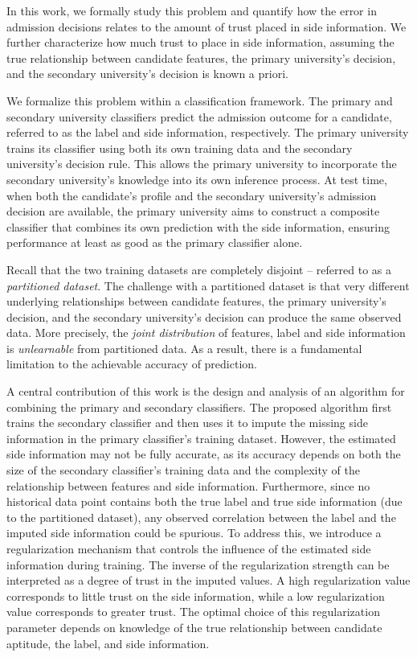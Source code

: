 In this work, we formally study this problem and quantify how the error in admission decisions relates to the amount of trust placed in side information. We further characterize how much trust to place in side information, assuming the true relationship between candidate features, the primary university’s decision, and the secondary university’s decision is known a priori.

We formalize this problem within a classification framework. The primary and secondary university classifiers predict the admission outcome for a candidate, referred to as the label and side information, respectively.
The primary university trains its classifier using both its own training data and the secondary university's decision rule. This allows the primary university to incorporate the secondary university's knowledge into its own inference process.
At test time, when both the candidate’s profile and the secondary university’s admission decision are available, the primary university aims to construct a composite classifier that combines its own prediction with the side information, ensuring performance at least as good as the primary classifier alone.

Recall that the two training datasets are completely disjoint -- referred to as a \textit{partitioned dataset}. The challenge with a partitioned dataset is that very different underlying relationships between candidate features, the primary university’s decision, and the secondary university’s decision can produce the same observed data. More precisely, the \textit{joint distribution} of features, label and side information is \textit{unlearnable} from partitioned data. As a result, there is a fundamental limitation to the achievable accuracy of prediction.


A central contribution of this work is the design and analysis of an algorithm for combining the primary and secondary classifiers. The proposed algorithm first trains the secondary classifier and then uses it to impute the missing side information in the primary classifier’s training dataset. However, the estimated side information may not be fully accurate, as its accuracy depends on both the size of the secondary classifier’s training data and the complexity of the relationship between features and side information. Furthermore, since no historical data point contains both the true label and true side information (due to the partitioned dataset), any observed correlation between the label and the imputed side information could be spurious. To address this, we introduce a regularization mechanism that controls the influence of the estimated side information during training. The inverse of the regularization strength can be interpreted as a degree of trust in the imputed values. A high regularization value corresponds to little trust on the side information, while a low regularization value corresponds to greater trust. The optimal choice of this regularization parameter depends on knowledge of the true relationship between candidate aptitude, the label, and side information.

